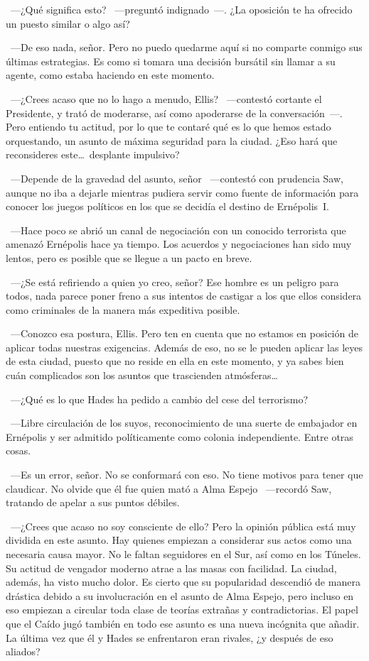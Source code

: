 ~---¿Qué significa esto? ~---preguntó indignado~---. ¿La oposición te ha ofrecido un puesto similar o algo así?

~---De eso nada, señor. Pero no puedo quedarme aquí si no comparte conmigo sus últimas estrategias. Es como si tomara una decisión bursátil sin llamar a su agente, como estaba haciendo en este momento.

~---¿Crees acaso que no lo hago a menudo, Ellis? ~---contestó cortante el Presidente, y trató de moderarse, así como apoderarse de la conversación~---. Pero entiendo tu actitud, por lo que te contaré qué es lo que hemos estado orquestando, un asunto de máxima seguridad para la ciudad. ¿Eso hará que reconsideres este\dots\ desplante impulsivo?

~---Depende de la gravedad del asunto, señor ~---contestó con prudencia Saw, aunque no iba a dejarle mientras pudiera servir como fuente de información para conocer los juegos políticos en los que se decidía el destino de Ernépolis~I.

~---Hace poco se abrió un canal de negociación con un conocido terrorista que amenazó Ernépolis hace ya tiempo. Los acuerdos y negociaciones han sido muy lentos, pero es posible que se llegue a un pacto en breve.

~---¿Se está refiriendo a quien yo creo, señor? Ese hombre es un peligro para todos, nada parece poner freno a sus intentos de castigar a los que ellos considera como criminales de la manera más expeditiva posible.

~---Conozco esa postura, Ellis. Pero ten en cuenta que no estamos en posición de aplicar todas nuestras exigencias. Además de eso, no se le pueden aplicar las leyes de esta ciudad, puesto que no reside en ella en este momento, y ya sabes bien cuán complicados son los asuntos que trascienden atmósferas\dots

~---¿Qué es lo que Hades ha pedido a cambio del cese del terrorismo?

~---Libre circulación de los suyos, reconocimiento de una suerte de embajador en Ernépolis y ser admitido políticamente como colonia independiente. Entre otras cosas.

~---Es un error, señor. No se conformará con eso. No tiene motivos para tener que claudicar. No olvide que él fue quien mató a Alma Espejo ~---recordó Saw, tratando de apelar a sus puntos débiles.

~---¿Crees que acaso no soy consciente de ello? Pero la opinión pública está muy dividida en este asunto. Hay quienes empiezan a considerar sus actos como una necesaria causa mayor. No le faltan seguidores en el Sur, así como en los Túneles. Su actitud de vengador moderno atrae a las masas con facilidad. La ciudad, además, ha visto mucho dolor. Es cierto que su popularidad descendió de manera drástica debido a su involucración en el asunto de Alma Espejo, pero incluso en eso empiezan a circular toda clase de teorías extrañas y contradictorias. El papel que el Caído jugó también en todo ese asunto es una nueva incógnita que añadir. La última vez que él y Hades se enfrentaron eran rivales, ¿y después de eso aliados?


